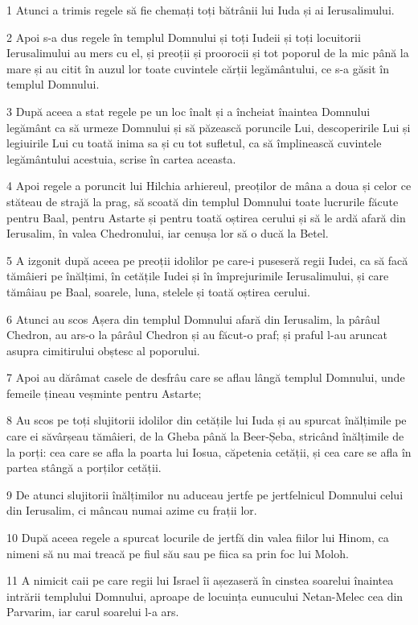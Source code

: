 \par 1 Atunci a trimis regele să fie chemați toți bătrânii lui Iuda și ai Ierusalimului.
\par 2 Apoi s-a dus regele în templul Domnului și toți Iudeii și toți locuitorii Ierusalimului au mers cu el, și preoții și proorocii și tot poporul de la mic până la mare și au citit în auzul lor toate cuvintele cărții legământului, ce s-a găsit în templul Domnului.
\par 3 După aceea a stat regele pe un loc înalt și a încheiat înaintea Domnului legământ ca să urmeze Domnului și să păzească poruncile Lui, descoperirile Lui și legiuirile Lui cu toată inima sa și cu tot sufletul, ca să împlinească cuvintele legământului acestuia, scrise în cartea aceasta.
\par 4 Apoi regele a poruncit lui Hilchia arhiereul, preoților de mâna a doua și celor ce stăteau de strajă la prag, să scoată din templul Domnului toate lucrurile făcute pentru Baal, pentru Astarte și pentru toată oștirea cerului și să le ardă afară din Ierusalim, în valea Chedronului, iar cenușa lor să o ducă la Betel.
\par 5 A izgonit după aceea pe preoții idolilor pe care-i puseseră regii Iudei, ca să facă tămâieri pe înălțimi, în cetățile Iudei și în împrejurimile Ierusalimului, și care tămâiau pe Baal, soarele, luna, stelele și toată oștirea cerului.
\par 6 Atunci au scos Așera din templul Domnului afară din Ierusalim, la pârâul Chedron, au ars-o la pârâul Chedron și au făcut-o praf; și praful l-au aruncat asupra cimitirului obștesc al poporului.
\par 7 Apoi au dărâmat casele de desfrâu care se aflau lângă templul Domnului, unde femeile țineau veșminte pentru Astarte;
\par 8 Au scos pe toți slujitorii idolilor din cetățile lui Iuda și au spurcat înălțimile pe care ei săvârșeau tămâieri, de la Gheba până la Beer-Șeba, stricând înălțimile de la porți: cea care se afla la poarta lui Iosua, căpetenia cetății, și cea care se afla în partea stângă a porților cetății.
\par 9 De atunci slujitorii înălțimilor nu aduceau jertfe pe jertfelnicul Domnului celui din Ierusalim, ci mâncau numai azime cu frații lor.
\par 10 După aceea regele a spurcat locurile de jertfă din valea fiilor lui Hinom, ca nimeni să nu mai treacă pe fiul său sau pe fiica sa prin foc lui Moloh.
\par 11 A nimicit caii pe care regii lui Israel îi așezaseră în cinstea soarelui înaintea intrării templului Domnului, aproape de locuința eunucului Netan-Melec cea din Parvarim, iar carul soarelui l-a ars.
